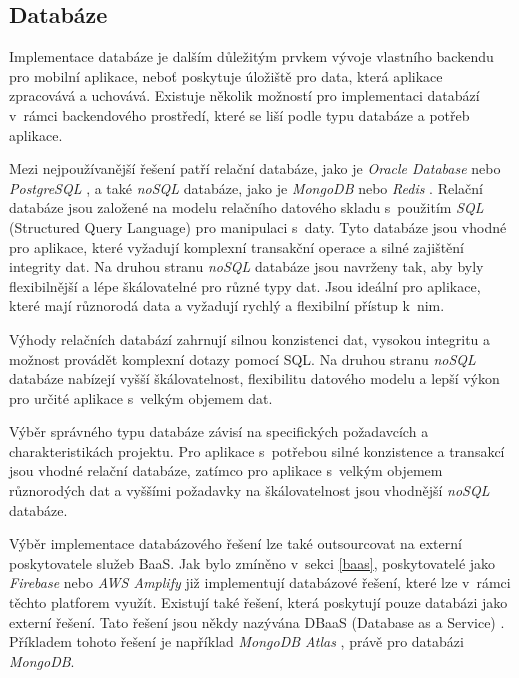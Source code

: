 \subsection{Databáze}

Implementace databáze je dalším důležitým prvkem vývoje vlastního backendu pro mobilní aplikace, neboť poskytuje úložiště pro data, která aplikace zpracovává a uchovává. Existuje několik možností pro implementaci databází v~rámci backendového prostředí, které se liší podle typu databáze a potřeb aplikace.

Mezi nejpoužívanější řešení patří relační databáze, jako je \emph{Oracle Database} \cite{oracle-database} nebo \emph{PostgreSQL} \cite{postgresql}, a také \emph{noSQL} databáze, jako je \emph{MongoDB} \cite{mongodb} nebo \emph{Redis} \cite{redis}. Relační databáze jsou založené na modelu relačního datového skladu s~použitím \emph{SQL} (Structured Query Language) pro manipulaci s~daty. Tyto databáze jsou vhodné pro aplikace, které vyžadují komplexní transakční operace a silné zajištění integrity dat. Na druhou stranu \emph{noSQL} databáze jsou navrženy tak, aby byly flexibilnější a lépe škálovatelné pro různé typy dat. Jsou ideální pro aplikace, které mají různorodá data a vyžadují rychlý a flexibilní přístup k~nim.

Výhody relačních databází zahrnují silnou konzistenci dat, vysokou integritu a možnost provádět komplexní dotazy pomocí SQL. Na druhou stranu \emph{noSQL} databáze nabízejí vyšší škálovatelnost, flexibilitu datového modelu a lepší výkon pro určité aplikace s~velkým objemem dat. \cite{fit-lecture-no-sql}

Výběr správného typu databáze závisí na specifických požadavcích a charakteristikách projektu. Pro aplikace s~potřebou silné konzistence a transakcí jsou vhodné relační databáze, zatímco pro aplikace s~velkým objemem různorodých dat a vyššími požadavky na škálovatelnost jsou vhodnější \emph{noSQL} databáze.

Výběr implementace databázového řešení lze také outsourcovat na externí poskytovatele služeb BaaS. Jak bylo zmíněno v~sekci \ref{baas}, poskytovatelé jako \emph{Firebase} \cite{firebase} nebo \emph{AWS Amplify} \cite{aws-amplify} již implementují databázové řešení, které lze v~rámci těchto platforem využít. Existují také řešení, která poskytují pouze databázi jako externí řešení. Tato řešení jsou někdy nazývána DBaaS (Database as a Service) \cite{mongodb-dbaas}. Příkladem tohoto řešení je například \emph{MongoDB Atlas} \cite{mongodb-atlas}, právě pro databázi \emph{MongoDB}.

